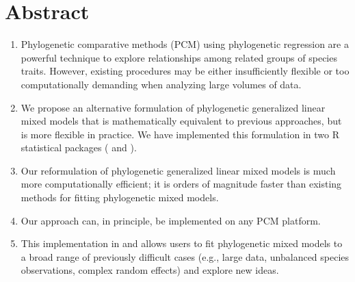 \documentclass[12pt]{article}
\begin{document}
% 
% 
% 
% 
% 
% 
% 
% 
% 
% 

\section*{Abstract}

\begin{enumerate}
\item{Phylogenetic comparative methods (PCM) using phylogenetic regression are a powerful technique to explore relationships among related groups of species traits. However, existing procedures may be either insufficiently flexible or too computationally demanding when analyzing large volumes of data.}
\item{We propose an alternative formulation of phylogenetic generalized linear mixed models that is mathematically equivalent to previous approaches, but is more flexible in practice. We have implemented this formulation in two R statistical packages ( and ).}
\item{Our reformulation of phylogenetic generalized linear mixed models is much more computationally efficient; it is orders of magnitude faster than existing methods for fitting phylogenetic mixed models.}
\item{Our approach can, in principle, be implemented on any PCM platform.}
\item{This implementation in  and  allows users to fit phylogenetic mixed models to a broad range of previously difficult cases (e.g., large data, unbalanced species observations, complex random effects) and explore new ideas.}
\end{enumerate}
\end{document}
